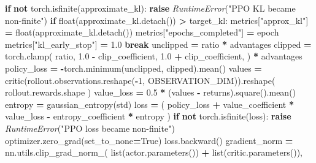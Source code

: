 \documentclass[
  chinese,
  11pt,
  letterpaper,
]{article}
\newenvironment{Shaded}{\begin{snugshade}}{\end{snugshade}}
\newcommand{\BuiltInTok}[1]{#1}
\newcommand{\ControlFlowTok}[1]{\textcolor[rgb]{0.13,0.29,0.53}{\textbf{#1}}}
\newcommand{\DecValTok}[1]{\textcolor[rgb]{0.00,0.00,0.81}{#1}}
\newcommand{\FloatTok}[1]{\textcolor[rgb]{0.00,0.00,0.81}{#1}}
\newcommand{\KeywordTok}[1]{\textcolor[rgb]{0.13,0.29,0.53}{\textbf{#1}}}
\newcommand{\NormalTok}[1]{#1}
\newcommand{\OperatorTok}[1]{\textcolor[rgb]{0.81,0.36,0.00}{\textbf{#1}}}
\newcommand{\PreprocessorTok}[1]{\textcolor[rgb]{0.56,0.35,0.01}{\textit{#1}}}
\newcommand{\StringTok}[1]{\textcolor[rgb]{0.31,0.60,0.02}{#1}}
\newcommand{\VariableTok}[1]{\textcolor[rgb]{0.00,0.00,0.00}{#1}}
\newcounter{none} %
\renewenvironment{Shaded}{\par\smallskip}{\par\smallskip}
\begin{document}
\begin{Shaded}
\begin{Highlighting}[]
        \ControlFlowTok{if} \KeywordTok{not}\NormalTok{ torch.isfinite(approximate\_kl):}
            \ControlFlowTok{raise} \PreprocessorTok{RuntimeError}\NormalTok{(}\StringTok{"PPO KL became non{-}finite"}\NormalTok{)}
        \ControlFlowTok{if} \BuiltInTok{float}\NormalTok{(approximate\_kl.detach()) }\OperatorTok{\textgreater{}}\NormalTok{ target\_kl:}
\NormalTok{            metrics[}\StringTok{"approx\_kl"}\NormalTok{] }\OperatorTok{=} \BuiltInTok{float}\NormalTok{(approximate\_kl.detach())}
\NormalTok{            metrics[}\StringTok{"epochs\_completed"}\NormalTok{] }\OperatorTok{=}\NormalTok{ epoch}
\NormalTok{            metrics[}\StringTok{"kl\_early\_stop"}\NormalTok{] }\OperatorTok{=} \FloatTok{1.0}
            \ControlFlowTok{break}
\NormalTok{        unclipped }\OperatorTok{=}\NormalTok{ ratio }\OperatorTok{*}\NormalTok{ advantages}
\NormalTok{        clipped }\OperatorTok{=}\NormalTok{ torch.clamp(}
\NormalTok{            ratio,}
            \FloatTok{1.0} \OperatorTok{{-}}\NormalTok{ clip\_coefficient,}
            \FloatTok{1.0} \OperatorTok{+}\NormalTok{ clip\_coefficient,}
\NormalTok{        ) }\OperatorTok{*}\NormalTok{ advantages}
\NormalTok{        policy\_loss }\OperatorTok{=} \OperatorTok{{-}}\NormalTok{torch.minimum(unclipped, clipped).mean()}
\NormalTok{        values }\OperatorTok{=}\NormalTok{ critic(rollout.observations.reshape(}\OperatorTok{{-}}\DecValTok{1}\NormalTok{, OBSERVATION\_DIM)).reshape(}
\NormalTok{            rollout.rewards.shape}
\NormalTok{        )}
\NormalTok{        value\_loss }\OperatorTok{=} \FloatTok{0.5} \OperatorTok{*}\NormalTok{ (values }\OperatorTok{{-}}\NormalTok{ returns).square().mean()}
\NormalTok{        entropy }\OperatorTok{=}\NormalTok{ gaussian\_entropy(std)}
\NormalTok{        loss }\OperatorTok{=}\NormalTok{ (}
\NormalTok{            policy\_loss}
            \OperatorTok{+}\NormalTok{ value\_coefficient }\OperatorTok{*}\NormalTok{ value\_loss}
            \OperatorTok{{-}}\NormalTok{ entropy\_coefficient }\OperatorTok{*}\NormalTok{ entropy}
\NormalTok{        )}
        \ControlFlowTok{if} \KeywordTok{not}\NormalTok{ torch.isfinite(loss):}
            \ControlFlowTok{raise} \PreprocessorTok{RuntimeError}\NormalTok{(}\StringTok{"PPO loss became non{-}finite"}\NormalTok{)}
\NormalTok{        optimizer.zero\_grad(set\_to\_none}\OperatorTok{=}\VariableTok{True}\NormalTok{)}
\NormalTok{        loss.backward()}
\NormalTok{        gradient\_norm }\OperatorTok{=}\NormalTok{ nn.utils.clip\_grad\_norm\_(}
            \BuiltInTok{list}\NormalTok{(actor.parameters()) }\OperatorTok{+} \BuiltInTok{list}\NormalTok{(critic.parameters()),}

\end{Highlighting}
\end{Shaded}
\end{document}
